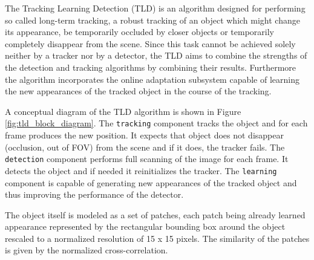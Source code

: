 The Tracking Learning Detection (TLD) \cite{Kalal:2012:TRA:2225045.2225082} is an algorithm designed for performing so called long-term tracking, a robust tracking of an object which might change its appearance, be temporarily occluded by closer objects or temporarily completely disappear from the scene. Since this task cannot be achieved solely neither by a tracker nor by a detector, the TLD aims to combine the strengths of the detection and tracking algorithms by combining their results. Furthermore the algorithm incorporates the online adaptation subsystem capable of learning the new appearances of the tracked object in the course of the tracking.

A conceptual diagram of the TLD algorithm is shown in Figure \ref{fig:tld_block_diagram}. The \texttt{tracking} component tracks the object and for each frame produces the new position. It expects that object does not disappear (occlusion, out of FOV) from the scene and if it does, the tracker fails. The \texttt{detection} component performs full scanning of the image for each frame. It detects the object and if needed it reinitializes the tracker. The \texttt{learning} component is capable of generating new appearances of the tracked object and thus improving the performance of the detector. 

The object itself is modeled as a set of patches, each patch being already learned appearance represented by the rectangular bounding box around the object rescaled to a normalized resolution of 15 x 15 pixels. The similarity of the patches is given by the normalized cross-correlation.

